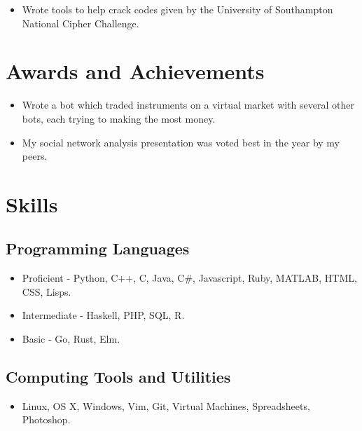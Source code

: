 \documentclass{jcgcv}
\begin{document}
\begin{column}
\begin{itemize}
  \item Wrote tools to help crack codes given by the University of Southampton National Cipher Challenge.
\end{itemize}



\section{Awards and Achievements}

\begin{itemize}
  \item Wrote a bot which traded instruments on a virtual market with several other bots, each trying to making the most money.
\end{itemize}

\begin{itemize}
  \item My social network analysis presentation was voted best in the year by my peers.
\end{itemize}



\section{Skills}

\subsection{Programming Languages}
\begin{itemize}
  \item Proficient - Python, C++, C, Java, C\#, Javascript, Ruby, MATLAB, HTML, CSS, Lisps.
  \item Intermediate - Haskell, PHP, SQL, R.
  \item Basic - Go, Rust, Elm.
\end{itemize}

\subsection{Computing Tools and Utilities}
\begin{itemize}
  \item Linux, OS X, Windows, Vim, Git, Virtual Machines, Spreadsheets, Photoshop.
\end{itemize}




\end{column}
\end{document}
